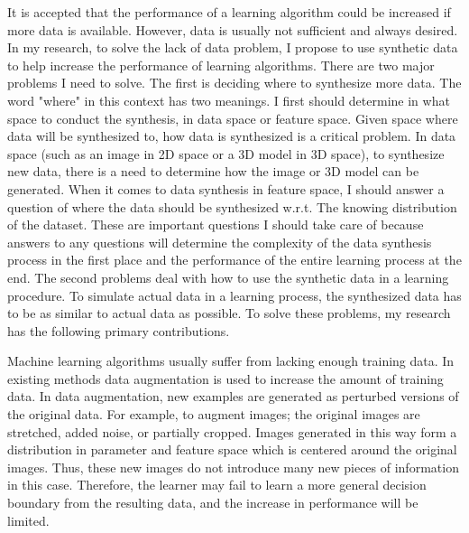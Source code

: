 \documentclass{iitthesis}
\begin{document}
It is accepted that the performance of a learning algorithm could be increased if more data is available. However, data is usually not sufficient and always desired. In my research, to solve the lack of data problem, I propose to use synthetic data to help increase the performance of learning algorithms. There are two major problems I need to solve. The first is deciding where to synthesize more data. The word "where" in this context has two meanings. I first should determine in what space to conduct the synthesis, in data space or feature space. Given space where data will be synthesized to, how data is synthesized is a critical problem. In data space (such as an image in 2D space or a 3D model in 3D space), to synthesize new data, there is a need to determine how the image or 3D model can be generated. When it comes to data synthesis in feature space, I should answer a question of where the data should be synthesized w.r.t. The knowing distribution of the dataset. These are important questions I should take care of because answers to any questions will determine the complexity of the data synthesis process in the first place and the performance of the entire learning process at the end. The second problems deal with how to use the synthetic data in a learning procedure. To simulate actual data in a learning process, the synthesized data has to be as similar to actual data as possible. To solve these problems, my research has the following primary contributions.

 Machine learning algorithms usually suffer from lacking enough training data. In existing methods data augmentation is used to increase the amount of training data. In data augmentation, new examples are generated as perturbed versions of the original data. For example, to augment images; the original images are stretched, added noise, or partially cropped. Images generated in this way form a distribution in parameter and feature space which is centered around the original images. Thus, these new images do not introduce many new pieces of information in this case. Therefore, the learner may fail to learn a more general decision boundary from the resulting data, and the increase in performance will be limited.
\end{document}
